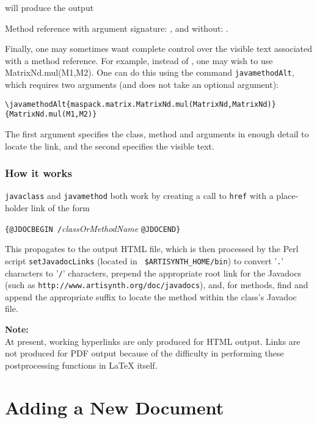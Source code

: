 \documentclass{article}
\begin{document}
will produce the output

Method reference with argument signature:
, and without:
.

Finally, one may sometimes want complete control over the visible text
associated with a method reference. For example,
instead of ,
one may wish to use 
%
{MatrixNd.mul(M1,M2)}. One can do this using the command
{\tt javamethodAlt}, which requires two arguments (and does
not take an optional argument):
%
\begin{lstlisting}[]
\javamethodAlt{maspack.matrix.MatrixNd.mul(MatrixNd,MatrixNd)}{MatrixNd.mul(M1,M2)}
\end{lstlisting}
%
The first argument specifies the class, method and arguments in enough
detail to locate the link, and the second specifies the visible text.

\subsubsection{How it works}

{\tt \BKS javaclass} and {\tt \BKS javamethod} both work by creating a call
to {\tt \BKS href} with a place-holder link of the form

 {\tt \{@JDOCBEGIN /}{\it classOrMethodName} {\tt @JDOCEND\}}

This propagates to the output HTML file, which is then processed by
the Perl script {\tt setJavadocLinks} (located in {\tt
\$ARTISYNTH\_HOME/bin}) to convert '{\tt .}' characters to '{\tt /}'
characters, prepend the appropriate root link for the Javadocs (such
as {\tt http://www.\-artisynth.org/doc/javadocs}), and, for methods,
find and append the appropriate suffix to locate the method within the
class's Javadoc file.

\begin{sideblock}
{\bf Note:}\\
At present, working hyperlinks are only produced for HTML output.
Links are not produced for PDF output because of the difficulty
in performing these postprocessing functions in LaTeX itself.
\end{sideblock}

\section{Adding a New Document}
\end{document}
